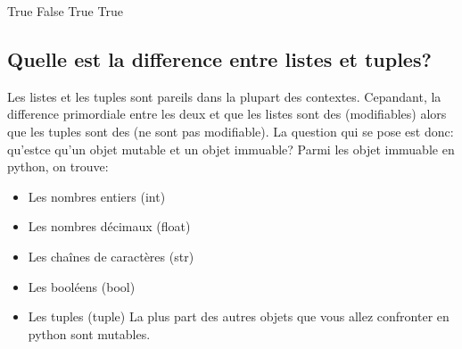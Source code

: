 \documentclass[letterpaper,10pt,french]{sphinxmanual}
\begin{document}
\begin{sphinxVerbatim}[commandchars=\\\{\}]
     

  

  

   

   
\end{sphinxVerbatim}

\begin{sphinxVerbatim}[commandchars=\\\{\}]
True
False
True
True
\end{sphinxVerbatim}


\subsection{Quelle est la difference entre listes et tuples?}
\label{\detokenize{ch4:quelle-est-la-difference-entre-listes-et-tuples}}
\sphinxAtStartPar
Les listes et les tuples sont pareils dans la plupart des contextes. Cepandant, la difference primordiale entre les deux et que les listes sont des  (modifiables) alors que les tuples sont des  (ne sont pas modifiable). La question qui se pose est donc: qu’est\sphinxhyphen{}ce qu’un objet mutable et un objet immuable?
Parmi les objet immuable en python, on trouve:
\begin{itemize}
\item {} 
\sphinxAtStartPar
Les nombres entiers (int)

\item {} 
\sphinxAtStartPar
Les nombres décimaux (float)

\item {} 
\sphinxAtStartPar
Les chaînes de caractères (str)

\item {} 
\sphinxAtStartPar
Les booléens (bool)

\item {} 
\sphinxAtStartPar
Les tuples (tuple)
La plus part des autres objets que vous allez confronter en python sont mutables.

\end{itemize}
\end{document}
